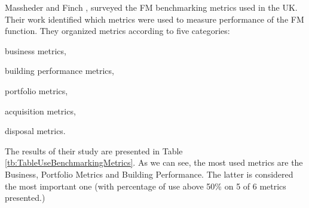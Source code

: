 
Massheder and Finch \cite{Mass1998}, surveyed the FM benchmarking metrics used in the UK. Their work identified which metrics were used to measure performance of the FM function. They organized metrics according to five categories:
\begin{enumerate*}[label=\itshape\roman{enumi})]
	\item business metrics,
	\item building performance metrics,
	\item portfolio metrics,
	\item acquisition  metrics,
	\item disposal metrics. 
\end{enumerate*} The results of their study are presented in Table \ref{tb:TableUseBenchmarkingMetrics}. As we can see, the most used metrics are the Business, Portfolio Metrics and Building Performance. The latter is considered the most important one (with percentage of use above 50\% on 5 of 6 metrics presented.)

